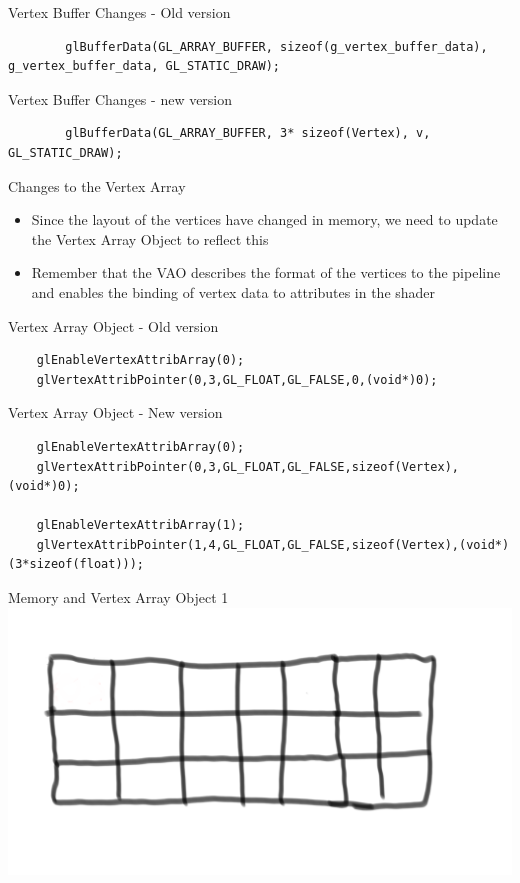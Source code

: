 \begin{frame}[fragile]{Vertex Buffer Changes - Old version}
	\begin{lstlisting}
		glBufferData(GL_ARRAY_BUFFER, sizeof(g_vertex_buffer_data), g_vertex_buffer_data, GL_STATIC_DRAW);
	\end{lstlisting}
\end{frame}

\begin{frame}[fragile]{Vertex Buffer Changes - new version}
	\begin{lstlisting}
		glBufferData(GL_ARRAY_BUFFER, 3* sizeof(Vertex), v, GL_STATIC_DRAW);
	\end{lstlisting}
\end{frame}

\begin{frame}{Changes to the Vertex Array}
	\begin{itemize}
		\pause\item Since the layout of the vertices have changed in memory, we need to update the Vertex Array Object to reflect this
		\pause\item Remember that the VAO describes the format of the vertices to the pipeline and enables the binding of vertex data to attributes in the shader 
	\end{itemize}
\end{frame}

\begin{frame}[fragile]{Vertex Array Object - Old version}
\begin{lstlisting}
	glEnableVertexAttribArray(0);
	glVertexAttribPointer(0,3,GL_FLOAT,GL_FALSE,0,(void*)0);
\end{lstlisting}
\end{frame}

\begin{frame}[fragile]{Vertex Array Object - New version}
\begin{lstlisting}
	glEnableVertexAttribArray(0);
	glVertexAttribPointer(0,3,GL_FLOAT,GL_FALSE,sizeof(Vertex),(void*)0);
	
	glEnableVertexAttribArray(1);
	glVertexAttribPointer(1,4,GL_FLOAT,GL_FALSE,sizeof(Vertex),(void*)(3*sizeof(float)));
\end{lstlisting}
\end{frame}

\begin{frame}{Memory and Vertex Array Object 1}
		\includegraphics[width=1\textwidth]{MemoryLayoutStarter}	
\end{frame}

